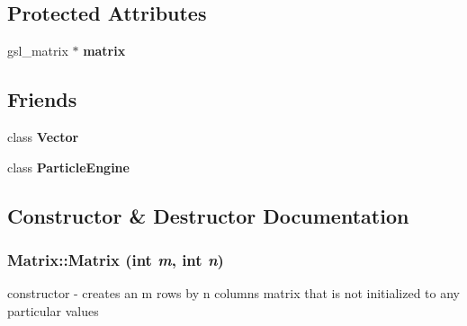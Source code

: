 \subsection*{Protected Attributes}
\begin{DoxyCompactItemize}
\item 
\hypertarget{classCartWheel_1_1Math_1_1Matrix_a24b0d755f36a5c307ad380714831034c}{
gsl\_\-matrix $\ast$ {\bfseries matrix}}
\label{classCartWheel_1_1Math_1_1Matrix_a24b0d755f36a5c307ad380714831034c}

\end{DoxyCompactItemize}
\subsection*{Friends}
\begin{DoxyCompactItemize}
\item 
\hypertarget{classCartWheel_1_1Math_1_1Matrix_a8d31999cf2d1c149956d35c1c01b3186}{
class {\bfseries Vector}}
\label{classCartWheel_1_1Math_1_1Matrix_a8d31999cf2d1c149956d35c1c01b3186}

\item 
\hypertarget{classCartWheel_1_1Math_1_1Matrix_a6ca36c96e96a4c87cf4e539a2c51bbda}{
class {\bfseries ParticleEngine}}
\label{classCartWheel_1_1Math_1_1Matrix_a6ca36c96e96a4c87cf4e539a2c51bbda}

\end{DoxyCompactItemize}


\subsection{Constructor \& Destructor Documentation}
\hypertarget{classCartWheel_1_1Math_1_1Matrix_a75e25f70a760fa9625afa33a3c44af8f}{
\subsubsection[{Matrix}]{\setlength{\rightskip}{0pt plus 5cm}Matrix::Matrix (int {\em m}, \/  int {\em n})}}
\label{classCartWheel_1_1Math_1_1Matrix_a75e25f70a760fa9625afa33a3c44af8f}
constructor -\/ creates an m rows by n columns matrix that is not initialized to any particular values

